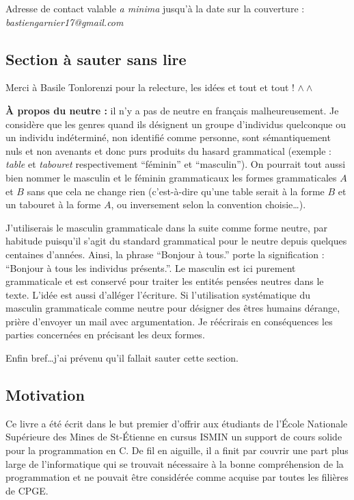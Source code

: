 \documentclass[../main.tex]{subfiles}
\begin{document}
Adresse de contact valable \textit{a minima} jusqu'à la date sur la couverture : \textit{bastiengarnier17@gmail.com}
\subsection*{Section à sauter sans lire}
Merci à Basile Tonlorenzi pour la relecture, les idées et tout et tout ! $\wedge\wedge$

\textbf{À propos du neutre :} il n'y a pas de neutre en français malheureusement. Je considère que les genres quand ils désignent un groupe d'individus quelconque ou un individu indéterminé, non identifié comme personne, sont sémantiquement nuls et non avenants et donc purs produits du hasard grammatical (exemple : \textit{table} et \textit{tabouret} respectivement ``féminin'' et ``masculin''). On pourrait tout aussi bien nommer le masculin et le féminin grammaticaux les formes grammaticales $A$ et $B$ sans que cela ne change rien (c'est-à-dire qu'une table serait à la forme $B$ et un tabouret à la forme $A$, ou inversement selon la convention choisie\dots).

J'utiliserais le masculin grammaticale dans la suite comme forme neutre, par habitude puisqu'il s'agit du standard grammatical pour le neutre depuis quelques centaines d'années. Ainsi, la phrase ``Bonjour à tous.'' porte la signification : ``Bonjour à tous les individus présents.''. Le masculin est ici purement grammaticale et est conservé pour traiter les entités pensées neutres dans le texte. L'idée est aussi d'alléger l'écriture. Si l'utilisation systématique du masculin grammaticale comme neutre pour désigner des êtres humains dérange, prière d'envoyer un mail avec argumentation. Je réécrirais en conséquences les parties concernées en précisant les deux formes.

Enfin bref\dots j'ai prévenu qu'il fallait sauter cette section.
\subsection*{Motivation}
Ce livre a été écrit dans le but premier d'offrir aux étudiants de l'École Nationale Supérieure des
Mines de St-Étienne en cursus ISMIN un support de cours solide pour la programmation en C. De fil
en aiguille, il a finit par couvrir une part plus large de l'informatique qui se trouvait nécessaire à la
bonne compréhension de la programmation et ne pouvait être considérée comme acquise par toutes les
filières de CPGE.
\end{document}

